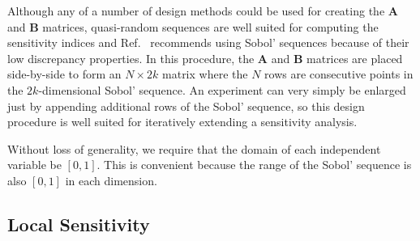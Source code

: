 \documentclass[12pt]{article}
\begin{document}
Although any of a number of design methods could be used for creating the $\mathbf{A}$ and $\mathbf{B}$ matrices, quasi-random sequences are well suited for computing the sensitivity indices and Ref.~\cite{saltelli_variance_2010} recommends using Sobol' sequences because of their low discrepancy properties. In this procedure, the $\mathbf{A}$ and $\mathbf{B}$ matrices are placed side-by-side to form an $N \times 2 k$ matrix where the $N$ rows are consecutive points in the $2 k$-dimensional Sobol' sequence. An experiment can very simply be enlarged just by appending additional rows of the Sobol' sequence, so this design procedure is well suited for iteratively extending a sensitivity analysis.

Without loss of generality, we require that the domain of each independent variable be $[0, 1]$. This is convenient because the range of the Sobol' sequence is also $[0, 1]$ in each dimension.


\subsection{Local Sensitivity}
\label{sec:local}
\end{document}
